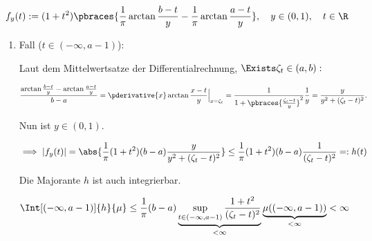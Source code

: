 \begin{solution}

\phantom{}

\begin{align*}
    f_y(t)
    :=
    (1 + t^2)
    \pbraces
    {
        \frac{1}{\pi}
        \arctan \frac{b - t}{y}
        -
        \frac{1}{\pi}
        \arctan \frac{a - t}{y}
    },
    \quad
    y \in (0, 1),
    \quad
    t \in \R
\end{align*}

\begin{enumerate}[label = \arabic*.]

    \item Fall ($t \in (-\infty, a - 1)$):
    
    Laut dem Mittelwertsatze der Differentialrechnung, $\Exists \zeta_t \in (a, b):$

    \begin{align*}
        \frac
        {
            \arctan \frac{b - t}{y}
            -
            \arctan \frac{a - t}{y}
        }{
            b - a
        }
        =
        \pderivative{x}
        \arctan \frac{x - t}{y}
        \Big |_{x = \zeta_t}
        =
        \frac{1}
        {
            1
            +
            \pbraces
            {
                \frac{\zeta_t - t}{y}
            }^2
        }
        \frac{1}{y}
        =
        \frac{y}{y^2 + (\zeta_t - t)^2}.
    \end{align*}

    Nun ist $y \in (0, 1)$.

    \begin{align*}
        \implies
        |f_y(t)|
        =
        \abs
        {
            \frac{1}{\pi}
            (1 + t^2)
            (b - a)
            \frac{y}{y^2 + (\zeta_t - t)^2}
        }
        \leq
        \frac{1}{\pi}
        (1 + t^2)
        (b - a)
        \frac{1}{(\zeta_t - t)^2}
        =:
        h(t)
    \end{align*}

    Die Majorante $h$ ist auch integrierbar.

    \begin{align*}
        \Int[(-\infty, a-1)]{h}{\mu}
        \leq
        \frac{1}{\pi}
        (b - a)
        \underbrace
        {
            \sup_{t \in (-\infty, a-1)}
            \frac{1 + t^2}{(\zeta_t - t)^2}
        }_{
            < \infty
        }
        \underbrace
        {
            \mu((-\infty, a-1))
        }_{
            < \infty
        }
        <
        \infty
    \end{align*}


\end{enumerate}
\end{solution}
